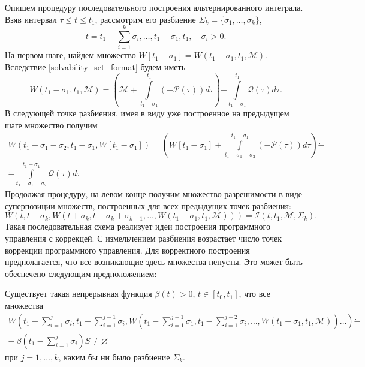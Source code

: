 Опишем процедуру последовательного построения альтернированного интеграла. Взяв
 интервал \( \tau \le t \le t_1 \), рассмотрим его разбиение \( \Sigma_k = \{ \sigma_1,
 \dots, \sigma_k \} \),
\begin{equation*}
    t = t_1 - \sum_{i=1}^k \sigma_i, \dots, t_1 - \sigma_1, t_1, \quad \sigma_i > 0.
\end{equation*}
На первом шаге, найдем множество \( W[t_1 - \sigma_1] = 
 W(t_1 - \sigma_1, t_1, \mathcal{M}) \). Вследствие \eqref{solvability_set_format}
 будем иметь
\begin{equation*}
     W(t_1 - \sigma_1, t_1, \mathcal{M}) = \left( \mathcal{M} + \int\limits_{t_1 - \sigma_1}
     ^{t_1}(-\mathcal{P}(\tau)) d\tau \right) \dot{-} \int\limits_{t_1 - \sigma_1}^{t_1}
     \mathcal{Q}(\tau)d\tau.
\end{equation*}
В следующей точке разбиения, имея в виду уже построенное на предыдущем шаге множество получим
\begin{equation*}
    \begin{gathered}
        W(t_1 - \sigma_1 -\sigma_2, t_1 - \sigma_1, W[t_1 - \sigma_1]) = \left( W[t_1 - \sigma_1]
        + \int\limits_{t_1 - \sigma_1 - \sigma_2}^{t_1 - \sigma_1} (-\mathcal{P}(\tau))d\tau \right)
        \dot{-} \\
        \dot{-} \int\limits_{t_1 - \sigma_1 - \sigma_2}^{t_1 - \sigma_1} \mathcal{Q}(\tau) d\tau
    \end{gathered}
\end{equation*}
Продолжая процедуру, на левом конце получим множество разрешимости в виде суперпозиции множеств, 
 построенных для всех предыдущих точек разбиения:
\begin{equation*}
    W(t, t + \sigma_k, W(t + \sigma_k, t + \sigma_k + \sigma_{k-1}, \dots, W(t_1 - \sigma_1, t_1,
    \mathcal{M}))) = \mathcal{I}(t, t_1, \mathcal{M}, \Sigma_k).
\end{equation*}
Такая последовательная схема реализует идеи построения программного управления с коррекцей.
С измельчением разбиения возрастает число точек коррекции программного управления.
Для корректного построения предполагается, что все возникающие здесь множества непусты. Это может 
 быть обеспечено следующим предположением:
\begin{assumption}\label{assumption_nonempty}
    Существует такая непрерывная функция \( \beta(t) > 0, \, t \in [t_0, t_1] \), что все
     множества
    \begin{equation}
        \begin{gathered}
            W \left( t_1 - \sum_{i=1}^j\sigma_i, t_1 - \sum_{i = 1}^{j - 1}\sigma_i, W 
             \left( t_1 - \sum_{i = 1}^ {j - 1} \sigma_1, t_1 - \sum_{i = 1}^{j - 2} 
             \sigma_i, \dots, W(t_1 - \sigma_1, t_1, \mathcal{M}) \right) \dots \right)
             \dot{-} \\
            \dot{-} \ \beta \left( t_1 - \sum_{i = 1}^j \sigma_i
             \right) S \ne \varnothing 
        \end{gathered}
    \end{equation}
    при \( j = 1, \dots, k \), каким бы ни было разбиение \( \Sigma_k \).
\end{assumption}

